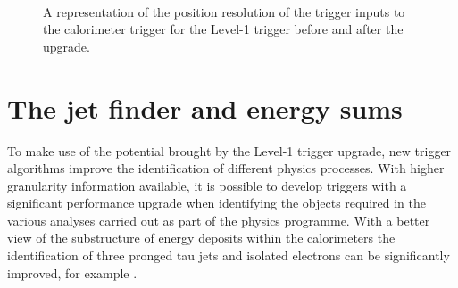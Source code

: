\begin{figure}[!t]
  \centering
  ~ 
   \\
  \caption{A representation of the position resolution of the trigger
  inputs to the calorimeter trigger for the Level-1 trigger before and
  after the upgrade.}
  \label{fig:sunnyJim}
\end{figure}


\section{The jet finder and energy sums}
\label{sec:jetFinder}

To make use of the potential brought by the Level-1 trigger upgrade,
new trigger algorithms improve the identification of different physics
processes. With higher granularity information available, it is
possible to develop triggers with a significant performance upgrade
when identifying the objects required in the various analyses carried
out as part of the \CMS physics programme.  With a better view of the
substructure of energy deposits within the calorimeters the
identification of three pronged tau jets and isolated electrons can be
significantly improved, for example \cite{egllr,taullr}. 

